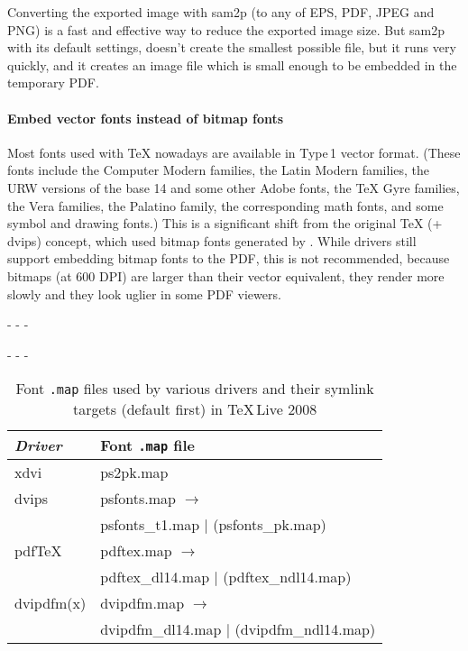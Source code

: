 \documentclass{ltugproc}
\def\cmd{\textsf}
\def\pkg{\textsf}
\def\captiontop#1{%
  \advance\abovecaptionskip-\belowcaptionskip
  \advance\belowcaptionskip\abovecaptionskip
  \advance\abovecaptionskip-\belowcaptionskip
  \abovecaptionskip-\abovecaptionskip
  \caption{#1}%
  \advance\abovecaptionskip-\belowcaptionskip
  \advance\belowcaptionskip\abovecaptionskip
  \advance\abovecaptionskip-\belowcaptionskip
  \abovecaptionskip-\abovecaptionskip
}
\begin{document}
Converting the exported image with \cmd{sam2p} (to any of EPS, PDF, JPEG and
PNG) is a fast and effective way to reduce the exported image size.
But \cmd{sam2p} with its default settings, doesn't create the
smallest possible file, but it runs very quickly, and it creates an image
file which is small enough to be embedded in the temporary PDF.

\paragraph{Embed vector fonts instead of bitmap fonts}

Most fonts used with \TeX{} nowadays are available in Type\,1 vector format.
(These fonts include the Computer Modern families, the Latin Modern families,
the URW versions of the base 14 and some other Adobe fonts,
the \TeX{} Gyre families, the Vera families, the Palatino family, the
corresponding math fonts, and some symbol and drawing fonts.) This is a
significant shift from the original \TeX{} (+ \cmd{dvips}) concept, which used
bitmap fonts generated by \MF{}. While drivers still support embedding
bitmap fonts to the PDF, this is not recommended, because bitmaps (at 600
DPI) are larger than their vector equivalent, they render more slowly and
they look uglier in some PDF viewers.

\begin{table}
\captiontop{Font \texttt{.map} files used by various drivers and their
symlink targets (default first) in \TeX{}\,Live 2008}\label{tab:mapfiles}
\par\small\noindent\hfil
\begin{tabular*}{\hsize}{@{\extracolsep{\fill}}ll@{}}
\toprule
\emph{Driver} & Font \texttt{.map} file\\
\midrule
\cmd{xdvi} & \pkg{ps2pk.map} \\
\cmd{dvips}& \pkg{psfonts.map} $\to$\\
           & \pkg{psfonts\_t1.map} $|$ (\pkg{psfonts\_pk.map}) \\
pdf\TeX{}  & \pkg{pdftex.map} $\to$\\
           & \pkg{pdftex\_dl14.map} $|$ (\pkg{pdftex\_ndl14.map}) \\
\cmd{dvipdfm(x)}& \pkg{dvipdfm.map} $\to$\\
                & \pkg{dvipdfm\_dl14.map} $|$ (\pkg{dvipdfm\_ndl14.map}) \\
\bottomrule
\end{tabular*}
\end{table}
\end{document}
